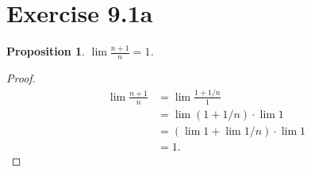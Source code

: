 \documentclass{article}
\newtheorem{proposition}[thm]{Proposition}
\begin{document}
\section*{Exercise 9.1a}
\begin{proposition}
    $\lim \frac{n+1}{n}=1$.
\end{proposition}
\begin{proof}
    \begin{align*}
        \lim \frac{n+1}{n} & = \lim \frac{1 + 1/n}{1} \\
        & = \lim (1+1/n) \cdot \lim 1 \\
        & = (\lim 1 + \lim 1/n)\cdot \lim 1 \\
        & = 1.
    \end{align*}
\end{proof}
\end{document}
